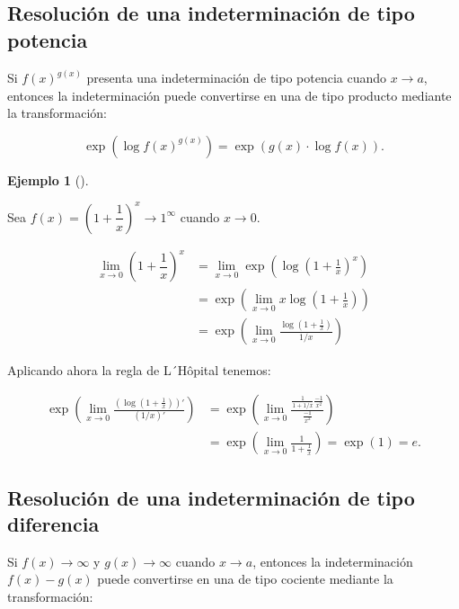 \documentclass[
  a4paper,
]{scrreport}
\theoremstyle{definition}
\newtheorem{example}{Ejemplo}[chapter]
\theoremstyle{plain}
\theoremstyle{definition}
\theoremstyle{definition}
\theoremstyle{plain}
\theoremstyle{plain}
\theoremstyle{remark}
\begin{document}
\subsection{Resolución de una indeterminación de tipo
potencia}\label{resoluciuxf3n-de-una-indeterminaciuxf3n-de-tipo-potencia}

Si \(f(x)^{g(x)}\) presenta una indeterminación de tipo potencia cuando
\(x\to a\), entonces la indeterminación puede convertirse en una de tipo
producto mediante la transformación:

\[\exp\left(\log f(x)^{g(x)}\right) = \exp\left(g(x)\cdot \log f(x)\right).\]

\begin{example}[]\protect\hypertarget{exm-solucion-indeterminacion-producto}{}\label{exm-solucion-indeterminacion-producto}

Sea \(f(x)=\left(1+\dfrac{1}{x}\right)^{x} \to 1^\infty\) cuando
\(x\to 0\).

\begin{align*}
\lim_{x\to 0}\left(1+\dfrac{1}{x}\right)^{x} &= \lim_{x\to
0}\exp\left(\log\left(1+\frac{1}{x}\right)^{x}\right)\\ 
&= \exp\left(\lim_{x\to
0}x\log\left(1+\frac{1}{x}\right)\right)\\
&= \exp\left(\lim_{x\to 0}\frac{\log\left(1+\frac{1}{x}\right)}{1/x}\right)
\end{align*}

Aplicando ahora la regla de L´Hôpital tenemos:

\begin{align*}
\exp\left(\lim_{x\to 0}\frac{\left(\log\left(1+\frac{1}{x}\right)\right)'}{\left(1/x\right)'}\right) &=
\exp\left(\lim_{x\to 0}\frac{\frac{1}{1+1/x}\frac{-1}{x^2}}{\frac{-1}{x^2}}\right) \\ 
&=
\exp\left(\lim_{x\to 0}\frac{1}{1+\frac{1}{x}}\right)=\exp(1)=e.
\end{align*}

\end{example}

\subsection{Resolución de una indeterminación de tipo
diferencia}\label{resoluciuxf3n-de-una-indeterminaciuxf3n-de-tipo-diferencia}

Si \(f(x)\to \infty\) y \(g(x)\to \infty\) cuando \(x\to a\), entonces
la indeterminación \(f(x)-g(x)\) puede convertirse en una de tipo
cociente mediante la transformación:
\end{document}
